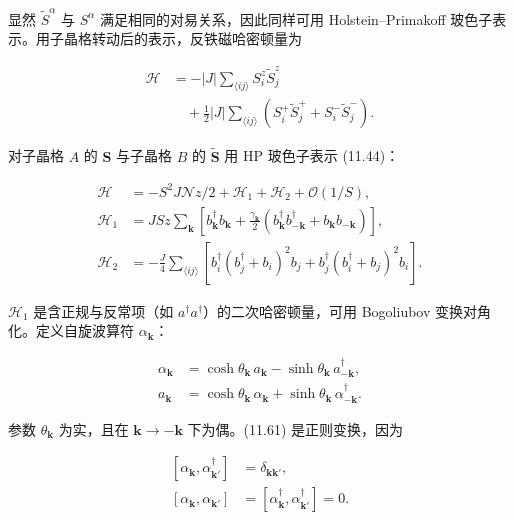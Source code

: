 显然 $\tilde{S}^{\alpha}$ 与 $S^{\alpha}$ 满足相同的对易关系，因此同样可用 Holstein--Primakoff 玻色子表示。用子晶格转动后的表示，反铁磁哈密顿量为

\begin{align*}
\mathcal {H} & = - | J | \sum_{\langle ij \rangle} S _ {i} ^ {z} \tilde {S} _ {j} ^ {z}\\
& \quad + \frac {1}{2} | J | \sum_{\langle ij \rangle} \left( S _ {i} ^ {+} \tilde {S} _ {j} ^ {+} + S _ {i} ^ {-} \tilde {S} _ {j} ^ {-} \right) .
\tag{11.59}
\end{align*}

对子晶格 $A$ 的 $\mathbf{S}$ 与子晶格 $B$ 的 $\tilde{\mathbf{S}}$ 用 HP 玻色子表示 (11.44)：

\begin{align*}
\mathcal {H} & = - S ^ {2} J \mathcal {N} z / 2 + \mathcal {H} _ {1} + \mathcal {H} _ {2} + \mathcal {O} ( 1/S ) ,\\
\mathcal {H} _ {1} & = J S z \sum_ {\mathbf {k}} \left[ b _ {\mathbf {k}} ^ {\dagger} b _ {\mathbf {k}} + \frac {\gamma_ {\mathbf {k}}}{2} \left( b _ {\mathbf {k}} ^ {\dagger} b _ {- \mathbf {k}} ^ {\dagger} + b _ {\mathbf {k}} b _ {- \mathbf {k}} \right) \right] ,\\
\mathcal {H} _ {2} & = - \frac {J}{4} \sum_{\langle ij \rangle} \left[ b _ {i} ^ {\dagger} \left( b _ {j} ^ {\dagger} + b _ {i} \right) ^ {2} b _ {j} + b _ {j} ^ {\dagger} \left( b _ {i} ^ {\dagger} + b _ {j} \right) ^ {2} b _ {i} \right] .
\tag{11.60}
\end{align*}

$\mathcal{H}_{1}$ 是含正规与反常项（如 $a^{\dagger}a^{\dagger}$）的二次哈密顿量，可用 Bogoliubov 变换对角化。定义自旋波算符 $\alpha_{\mathbf{k}}$：

\begin{align*}
\alpha_ {\mathbf {k}} & = \cosh \theta_ {\mathbf {k}} \, a _ {\mathbf {k}} - \sinh \theta_ {\mathbf {k}} \, a _ {- \mathbf {k}} ^ {\dagger} ,\\
a _ {\mathbf {k}} & = \cosh \theta_ {\mathbf {k}} \, \alpha_ {\mathbf {k}} + \sinh \theta_ {\mathbf {k}} \, \alpha_ {- \mathbf {k}} ^ {\dagger} .
\tag{11.61}
\end{align*}

参数 $\theta_{\mathbf{k}}$ 为实，且在 $\mathbf{k} \to -\mathbf{k}$ 下为偶。(11.61) 是正则变换，因为

\begin{align*}
\left[ \alpha_ {\mathbf {k}}, \alpha_ {\mathbf {k} '} ^ {\dagger} \right] & = \delta_ {\mathbf {kk} '} ,\\
\left[ \alpha_ {\mathbf {k}}, \alpha_ {\mathbf {k} '} \right] & = \left[ \alpha_ {\mathbf {k}} ^ {\dagger}, \alpha_ {\mathbf {k} '} ^ {\dagger} \right] = 0 .
\tag{11.62}
\end{align*}

